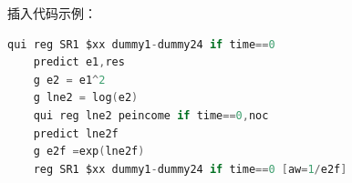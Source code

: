 \documentclass[a4paper,12pt]{report}
\begin{document}
插入代码示例：
\begin{lstlisting}[language=C]
    qui reg SR1 $xx dummy1-dummy24 if time==0
    predict e1,res
    g e2 = e1^2
    g lne2 = log(e2)
    qui reg lne2 peincome if time==0,noc
    predict lne2f
    g e2f =exp(lne2f)
    reg SR1 $xx dummy1-dummy24 if time==0 [aw=1/e2f]
\end{lstlisting}



\printbibliography
\end{document}
